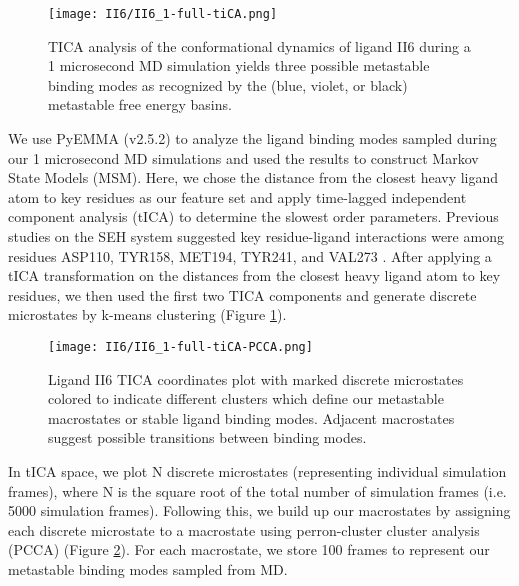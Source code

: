 \documentclass[journal=jcisd8,manuscript=article]{achemso}
\begin{document}
\begin{figure}
    \centering
    \texttt{[image: II6/II6\_1-full-tiCA.png]}
    \caption{TICA analysis of the conformational dynamics of ligand II6 during a 1 microsecond MD simulation yields three possible metastable binding modes as recognized by the (blue, violet, or black) metastable free energy basins.}
    \label{fig:II6_1_tica-kmeans}
\end{figure}

We use PyEMMA (v2.5.2) to analyze the ligand binding modes sampled during our 1 microsecond MD simulations and used the results to construct Markov State Models (MSM)\cite{scherer_pyemma_2015}. 
Here, we chose the distance from the closest heavy ligand atom to key residues as our feature set and apply time-lagged independent component analysis (tICA) \cite{perez-hernandez_identification_2013} to determine the slowest order parameters. 
Previous studies on the SEH system suggested key residue-ligand interactions were among residues ASP110, TYR158, MET194, TYR241, and VAL273 \cite{lotz_unbiased_2018}. 
After applying a tICA transformation on the distances from the closest heavy ligand atom to key residues, we then used the first two TICA components and generate discrete microstates by k-means clustering (Figure \ref{fig:II6_1_tica-kmeans}).

\begin{figure}
    \centering
    \texttt{[image: II6/II6\_1-full-tiCA-PCCA.png]}
    \caption{Ligand II6 TICA coordinates plot with marked discrete microstates colored to indicate different clusters which define our metastable macrostates or stable ligand binding modes. Adjacent macrostates suggest possible transitions between binding modes.}
    \label{fig:II6_1-TICA-PCCA}
\end{figure}

In tICA space, we plot N discrete microstates (representing individual simulation frames), where N is the square root of the total number of simulation frames (i.e. 5000 simulation frames). 
Following this, we build up our macrostates by assigning each discrete microstate to a macrostate using perron-cluster cluster analysis (PCCA) \cite{roblitz_fuzzy_2013,deuflhard_robust_2005} (Figure \ref{fig:II6_1-TICA-PCCA}).
For each macrostate, we store 100 frames to represent our metastable binding modes sampled from MD.
\end{document}
